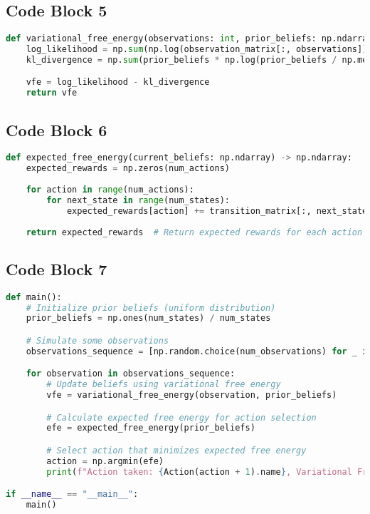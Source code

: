 \documentclass[11pt,a4paper]{article}
\begin{document}
\subsection{Code Block 5}

\begin{lstlisting}[language=Python, caption={Implementation code for the POMDP with Active Inference}]
def variational_free_energy(observations: int, prior_beliefs: np.ndarray) -> float:
    log_likelihood = np.sum(np.log(observation_matrix[:, observations]))
    kl_divergence = np.sum(prior_beliefs * np.log(prior_beliefs / np.mean(prior_beliefs)))

    vfe = log_likelihood - kl_divergence
    return vfe
\end{lstlisting}


\subsection{Code Block 6}

\begin{lstlisting}[language=Python, caption={Implementation code for the POMDP with Active Inference}]
def expected_free_energy(current_beliefs: np.ndarray) -> np.ndarray:
    expected_rewards = np.zeros(num_actions)
    
    for action in range(num_actions):
        for next_state in range(num_states):
            expected_rewards[action] += transition_matrix[:, next_state, action] * reward_function(State(next_state + 1), Action(action + 1))
    
    return expected_rewards  # Return expected rewards for each action
\end{lstlisting}


\subsection{Code Block 7}

\begin{lstlisting}[language=Python, caption={Implementation code for the POMDP with Active Inference}]
def main():
    # Initialize prior beliefs (uniform distribution)
    prior_beliefs = np.ones(num_states) / num_states

    # Simulate some observations
    observations_sequence = [np.random.choice(num_observations) for _ in range(10)]

    for observation in observations_sequence:
        # Update beliefs using variational free energy
        vfe = variational_free_energy(observation, prior_beliefs)

        # Calculate expected free energy for action selection
        efe = expected_free_energy(prior_beliefs)

        # Select action that minimizes expected free energy
        action = np.argmin(efe)
        print(f"Action taken: {Action(action + 1).name}, Variational Free Energy: {vfe:.2f}, Expected Free Energy: {efe[action]:.2f}")

if __name__ == "__main__":
    main()
\end{lstlisting}
\end{document}
